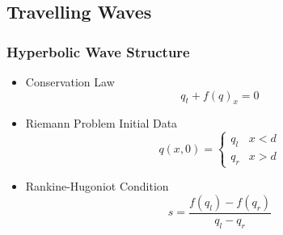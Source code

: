 \documentclass[10pt]{beamer}
\begin{document}
  \subsection{Travelling Waves}
    \begin{frame}
      \frametitle{Hyperbolic Wave Structure}
      \begin{itemize}
        \item Conservation Law
          \[
            q_t + f{(q)}_x = 0
          \]
        \item Riemann Problem Initial Data
          \[
            q(x, 0) =
            \begin{cases}
              q_l & x < d \\
              q_r & x > d
            \end{cases}
          \]

        \item Rankine-Hugoniot Condition
          \[
            s = \frac{f(q_l) - f(q_r)}{q_l - q_r}
          \]
      \end{itemize}
    \end{frame}
\end{document}
